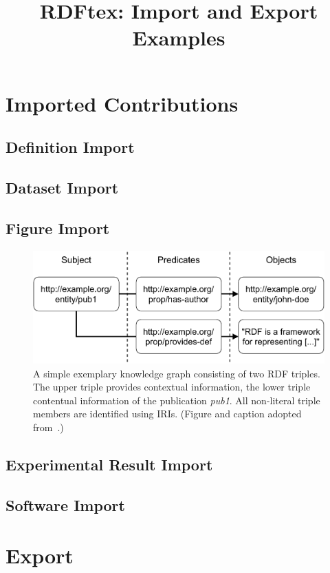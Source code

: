 \documentclass{article}
\title{RDFtex: Import and Export Examples}
\date{}
\begin{document}
\maketitle

\section{Imported Contributions}

\subsection*{Definition Import}

\subsection*{Dataset Import}

\subsection*{Figure Import}


\begin{figure}[htb!]
\centering
\includegraphics[max width=0.7\columnwidth]{./figures/triple_example}
\caption{A simple exemplary knowledge graph consisting of two RDF triples. The upper triple provides contextual information, the lower triple contentual information of the publication \emph{{pub1}}. All non-literal triple members are identified using IRIs. (Figure and caption adopted from~\cite{Martin21}.)}
\label{fig:contentual-contextual}
\end{figure}

\subsection*{Experimental Result Import}

\subsection*{Software Import}

\section{Export}
\end{document}
